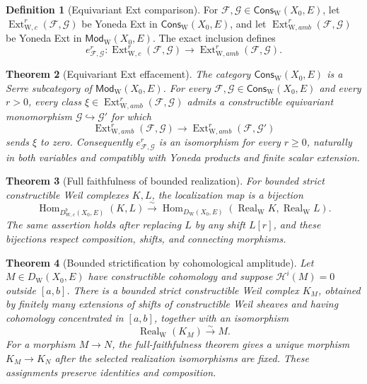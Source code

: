 \documentclass[10pt]{article}
\newtheorem{theorem}{Theorem}[section]
\theoremstyle{definition}
\newtheorem{definition}[theorem]{Definition}
\newcommand{\WeilD}{D^b_{\mathrm W,c}}
\begin{document}
\begin{definition}[Equivariant Ext comparison]
For \(\mathcal F,\mathcal G\in\mathsf{Cons}_{\mathrm W}(X_0,E)\), let
\(\operatorname{Ext}^r_{\mathrm W,c}(\mathcal F,\mathcal G)\) be Yoneda
Ext in \(\mathsf{Cons}_{\mathrm W}(X_0,E)\), and let
\(\operatorname{Ext}^r_{\mathrm W,amb}(\mathcal F,\mathcal G)\) be Yoneda
Ext in \(\mathsf{Mod}_{\mathrm W}(X_0,E)\).  The exact inclusion defines
\[
 e^r_{\mathcal F,\mathcal G}:
 \operatorname{Ext}^r_{\mathrm W,c}(\mathcal F,\mathcal G)
 \longrightarrow
 \operatorname{Ext}^r_{\mathrm W,amb}(\mathcal F,\mathcal G).
\]
\end{definition}

\begin{theorem}[Equivariant Ext effacement]
The category \(\mathsf{Cons}_{\mathrm W}(X_0,E)\) is a Serre subcategory of
\(\mathsf{Mod}_{\mathrm W}(X_0,E)\).  For every
\(\mathcal F,\mathcal G\in\mathsf{Cons}_{\mathrm W}(X_0,E)\) and every
\(r>0\), every class
\(\xi\in\operatorname{Ext}^r_{\mathrm W,amb}(\mathcal F,\mathcal G)\)
admits a constructible equivariant monomorphism
\(\mathcal G\hookrightarrow\mathcal G'\) for which
\[
 \operatorname{Ext}^r_{\mathrm W,amb}(\mathcal F,\mathcal G)
 \longrightarrow
 \operatorname{Ext}^r_{\mathrm W,amb}(\mathcal F,\mathcal G')
\]
sends \(\xi\) to zero.  Consequently
\(e^r_{\mathcal F,\mathcal G}\) is an isomorphism
for every \(r\ge0\), naturally in both variables and compatibly with Yoneda
products and finite scalar extension.
\end{theorem}

\begin{theorem}[Full faithfulness of bounded realization]
For bounded strict constructible Weil complexes \(K,L\), the localization
map is a bijection
\[
 \operatorname{Hom}_{\WeilD(X_0,E)}(K,L)
 \xrightarrow{\sim}
 \operatorname{Hom}_{D_{\mathrm W}(X_0,E)}
       (\operatorname{Real}_{\mathrm W}K,
        \operatorname{Real}_{\mathrm W}L).
\]
The same assertion holds after replacing \(L\) by any shift \(L[r]\), and
these bijections respect composition, shifts, and connecting morphisms.
\end{theorem}

\begin{theorem}[Bounded strictification by cohomological amplitude]
Let \(M\in D_{\mathrm W}(X_0,E)\) have constructible cohomology and suppose
\(\mathcal H^i(M)=0\) outside \([a,b]\).  There is a bounded strict
constructible Weil complex \(K_M\), obtained by finitely many extensions of
shifts of constructible Weil sheaves and having cohomology concentrated in
\([a,b]\), together with an isomorphism
\[
 \operatorname{Real}_{\mathrm W}(K_M)\xrightarrow{\sim}M.
\]
For a morphism \(M\to N\), the full-faithfulness theorem gives a unique
morphism \(K_M\to K_N\) after the selected realization isomorphisms are
fixed.  These assignments preserve identities and composition.
\end{theorem}
\end{document}
